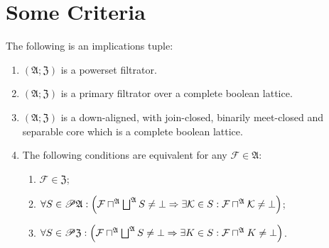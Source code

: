 \section{Some Criteria}
\begin{thm}
\label{crit1}The following is an implications tuple:
\begin{enumerate}
\item \label{crit1-p}$(\mathfrak{A};\mathfrak{Z})$ is a powerset filtrator.
\item \label{crit1-f}$(\mathfrak{A};\mathfrak{Z})$ is a primary filtrator
over a complete boolean lattice.
\item \label{crit1-fltr}$(\mathfrak{A};\mathfrak{Z})$ is a down-aligned,
with join-closed, binarily meet-closed and separable core which is
a complete boolean lattice.
\item \label{crit1-conc}The following conditions are equivalent for any
$\mathcal{F}\in\mathfrak{A}$:

\begin{enumerate}
\item \label{crit1-core}$\mathcal{F}\in\mathfrak{Z}$;
\item \label{crit1-flt}$\forall S\in\mathscr{P}\mathfrak{A}:\left(\mathcal{F}\sqcap^{\mathfrak{A}}\bigsqcup^{\mathfrak{A}}S\ne\bot\Rightarrow\exists\mathcal{K}\in S:\mathcal{F}\sqcap^{\mathfrak{A}}\mathcal{K}\ne\bot\right)$;
\item \label{crit1-princ}$\forall S\in\mathscr{P}\mathfrak{Z}:\left(\mathcal{F}\sqcap^{\mathfrak{A}}\bigsqcup^{\mathfrak{A}}S\ne\bot\Rightarrow\exists K\in S:\mathcal{F}\sqcap^{\mathfrak{A}}K\ne\bot\right)$.
\end{enumerate}
\end{enumerate}
\end{thm}
